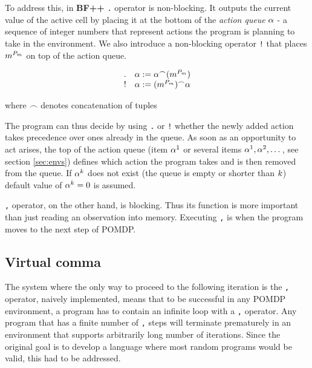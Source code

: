To address this, in \textbf{BF++} \texttt{.} operator is non-blocking.
It outputs the current value of the active cell by placing it at the bottom of the \textit{action queue} $\alpha$ - a sequence of integer numbers that represent actions the program is planning to take in the environment. We also introduce a non-blocking operator \texttt{!} that places $m^{P_m}$ on top of the action queue.

\begin{equation}
    \begin{array}{cc}
         . & \alpha := \alpha^\frown (m^{P_m}) \\
         ! & \alpha := (m^{P_m})^\frown \alpha
    \end{array}
\end{equation}

where $\frown$ denotes concatenation of tuples

The program can thus decide by using \texttt{.} or \texttt{!} whether the newly added action takes precedence over ones already in the queue.
As soon as an opportunity to act arises, the top of the action queue (item $\alpha^1$ or several items $\alpha^1,\alpha^2,\dots$, see section \ref{sec:envs}) defines which action the program takes and is then removed from the queue. 
If $\alpha^k$ does not exist (the queue is empty or shorter than $k$) default value of $\alpha^k=0$ is assumed.

\texttt{,} operator, on the other hand, is blocking. 
Thus its function is more important than just reading an observation into memory.
Executing \texttt{,} is when the program moves to the next step of POMDP.

\subsection{Virtual comma}
\label{sec:virtualcomma}


The system where the only way to proceed to the following iteration is the \texttt{,} operator, naively implemented, means that to be successful in any POMDP environment, a program has to contain an infinite loop with a \texttt{,} operator.
Any program that has a finite number of \texttt{,} steps will terminate prematurely in an environment that supports arbitrarily long number of iterations.
Since the original goal is to develop a language where most random programs would be valid, this had to be addressed.

